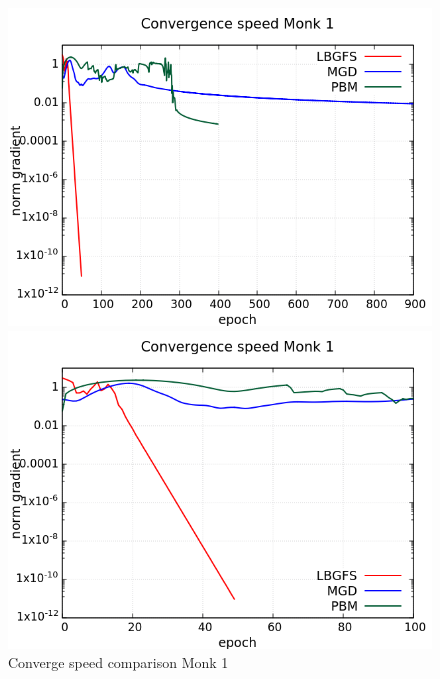 \begin{figure}[H]
	\centering
	\begin{minipage}[t]{0.5\linewidth}
		\includegraphics[width=\linewidth]{data/Comparison/Monk1/Monk1_CS_Comparison_log_standard.png}
	\end{minipage}%
	\begin{minipage}[t]{0.5\linewidth}
		\includegraphics[width=\linewidth]{data/Comparison/Monk1/Monk1_CS_Comparison_log_zoom.png}
	\end{minipage}
	\caption{Converge speed comparison Monk 1}
	\label{CS-Monk1}
\end{figure}
